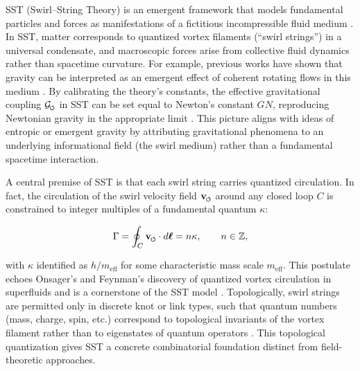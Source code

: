 \documentclass[12pt]{article}
\DeclareRobustCommand{\swirlarrow}{
\mathchoice{\mkern-2mu\scriptstyle\boldsymbol{\circlearrowleft}}%
{\mkern-2mu\scriptstyle\boldsymbol{\circlearrowleft}}%
{\mkern-2mu\scriptscriptstyle\boldsymbol{\circlearrowleft}}%
{\mkern-2mu\scriptscriptstyle\boldsymbol{\circlearrowleft}}
}%
\newcommand{\Gswirl}{\mathcal{G}_{\swirlarrow}}
\begin{document}
SST (Swirl--String Theory) is an emergent framework that models fundamental particles and forces as manifestations of a fictitious incompressible fluid medium \cite{Iskandarani2025Canon}. In SST, matter corresponds to quantized vortex filaments (``swirl strings'') in a universal condensate, and macroscopic forces arise from collective fluid dynamics rather than spacetime curvature. For example, previous works have shown that gravity can be interpreted as an emergent effect of coherent rotating flows in this medium \cite{Iskandarani2025RotatingFrame}. By calibrating the theory's constants, the effective gravitational coupling $\Gswirl$ in SST can be set equal to Newton's constant $G{N}$, reproducing Newtonian gravity in the appropriate limit \cite{Iskandarani2025Canon}. This picture aligns with ideas of entropic or emergent gravity \cite{Verlinde2011,Verlinde2017,Jacobson1995,Padmanabhan2010} by attributing gravitational phenomena to an underlying informational field (the swirl medium) rather than a fundamental spacetime interaction.




A central premise of SST is that each swirl string carries quantized circulation. In fact, the circulation of the swirl velocity field $\mathbf{v}_{\swirlarrow}$ around any closed loop $C$ is constrained to integer multiples of a fundamental quantum $\kappa$:

\begin{equation}\label{eq:circulation}

\Gamma = \oint_C \mathbf{v}_{\swirlarrow}\cdot d\boldsymbol{\ell} = n\kappa, \qquad n \in \mathbb{Z},
\end{equation}

with $\kappa$ identified as $h/m_\text{eff}$ for some characteristic mass scale $m_\text{eff}$. This postulate echoes Onsager's and Feynman's discovery of quantized vortex circulation in superfluids and is a cornerstone of the SST model \cite{Onsager1949,Feynman1955}. Topologically, swirl strings are permitted only in discrete knot or link types, such that quantum numbers (mass, charge, spin, etc.) correspond to topological invariants of the vortex filament rather than to eigenstates of quantum operators \cite{Iskandarani2025Canon}. This topological quantization gives SST a concrete combinatorial foundation distinct from field-theoretic approaches.
\end{document}
